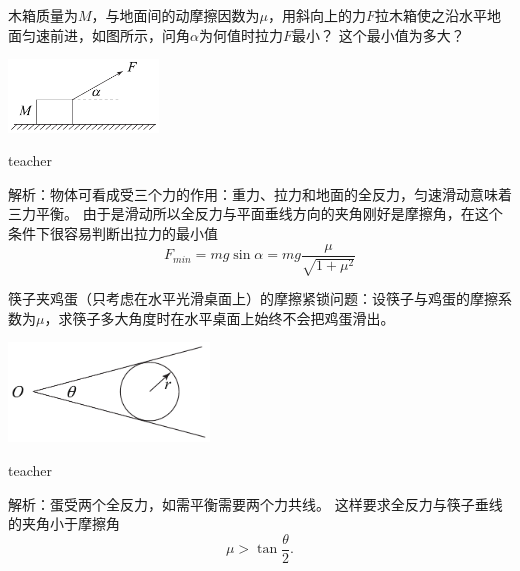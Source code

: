\begin{example}
木箱质量为$M$，与地面间的动摩擦因数为$\mu$，用斜向上的力$F$拉木箱使之沿水平地面匀速前进，如图所示，问角$\alpha$为何值时拉力$F$最小？
这个最小值为多大？
\begin{flushright}
\includegraphics[width = 0.3\textwidth]{images/static-force-5.pdf} 
\end{flushright}

\begin{taggedblock}{teacher}

\vspace*{3cm}
\noindent
解析：物体可看成受三个力的作用：重力、拉力和地面的全反力，匀速滑动意味着三力平衡。
由于是滑动所以全反力与平面垂线方向的夹角刚好是摩擦角，在这个条件下很容易判断出拉力的最小值
\[
F_{min} = mg\sin\alpha = mg\frac{\mu}{\sqrt{1+\mu^2}}
\]
\end{taggedblock}
\end{example}


\begin{example}
筷子夹鸡蛋（只考虑在水平光滑桌面上）的摩擦紧锁问题：设筷子与鸡蛋的摩擦系数为$\mu$，求筷子多大角度时在水平桌面上始终不会把鸡蛋滑出。
\begin{flushright}
\includegraphics[width = 0.4\textwidth]{images/static-force-4.pdf} 
\end{flushright}
\begin{taggedblock}{teacher}

\vspace*{2cm}
\noindent
解析：蛋受两个全反力，如需平衡需要两个力共线。
这样要求全反力与筷子垂线的夹角小于摩擦角
\[
\mu>\tan\frac{\theta}{2}.
\]
\end{taggedblock}
\end{example}



